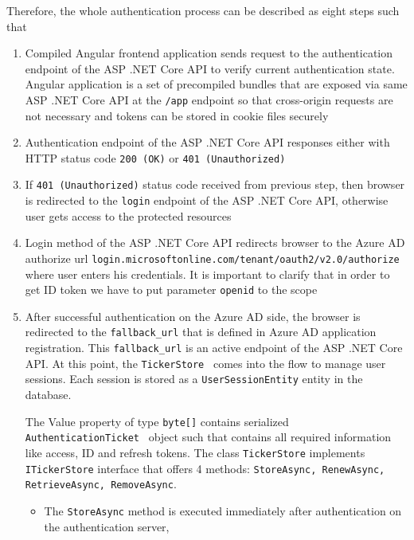 Therefore, the whole authentication process can be described as eight steps such that
\begin{enumerate}
    \item Compiled Angular frontend application sends request to the authentication endpoint of the ASP .NET Core API
    to verify current authentication state.
    Angular application is a set of precompiled bundles that are exposed via same ASP .NET Core API at the \texttt{/app}
    endpoint so that cross-origin requests are not necessary and tokens can be stored in cookie files securely
    \item Authentication endpoint of the ASP .NET Core API responses either with
    HTTP status code \texttt{200 (OK)} or \texttt{401 (Unauthorized)}
    \item If \texttt{401 (Unauthorized)} status code received from previous step,
    then browser is redirected to the \texttt{login} endpoint of the ASP .NET Core API,
    otherwise user gets access to the protected resources
    \item Login method of the ASP .NET Core API redirects browser to the Azure AD authorize url
    \texttt{login.microsoftonline.com/tenant/oauth2/v2.0/authorize} where user enters his credentials.
    It is important to clarify that in order to get ID token we have to put parameter \texttt{openid} to the scope
    
    \item After successful authentication on the Azure AD side, the browser is redirected to the \texttt{fallback\_url}
    that is defined in Azure AD application registration.
    This \texttt{fallback\_url} is an active endpoint of the ASP .NET Core API\@.
    At this point, the \texttt{TickerStore}~\cite{microsoftIticketstore2023, ticketStore_2023}
    comes into the flow to manage user sessions.
    Each session is stored as a \texttt{UserSessionEntity} entity in the database.
    
    The Value property of type \texttt{byte[]} contains serialized \texttt{AuthenticationTicket}~\cite{microsoftAuthenticationTicket2023}
    object such that contains all required information like access, ID and refresh tokens.
    The class \texttt{TickerStore} implements \texttt{ITickerStore} interface that offers 4 methods:
    \texttt{StoreAsync, RenewAsync, RetrieveAsync, RemoveAsync}.
    \begin{itemize}
        \item The \texttt{StoreAsync} method is executed immediately after authentication on the authentication server,

\end{itemize}
\end{enumerate}
